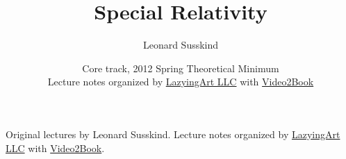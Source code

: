 \documentclass[11pt,oneside]{book}
\begin{document}
\frontmatter

\title{Special Relativity}
\author{Leonard Susskind}
\date{Core track, 2012 Spring Theoretical Minimum \\ Lecture notes organized by \href{https://lazying.art}{LazyingArt LLC} with \href{https://github.com/lachlanchen/Video2Book}{Video2Book}}
\maketitle
\begin{center}
\small Original lectures by Leonard Susskind. Lecture notes organized by \href{https://lazying.art}{LazyingArt LLC} with \href{https://github.com/lachlanchen/Video2Book}{Video2Book}.
\end{center}
\clearpage
\tableofcontents
\mainmatter










\end{document}

